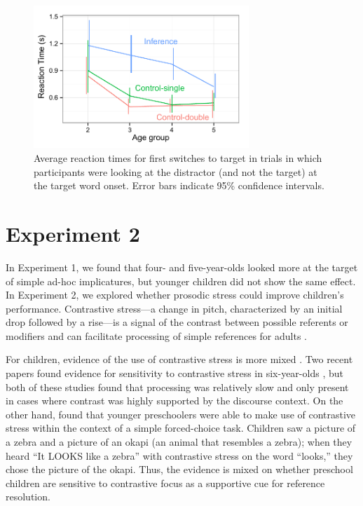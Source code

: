 \documentclass[10pt,letterpaper]{article}
\begin{document}
\begin{figure}
\begin{centering} 
\includegraphics[width=3.2in]{figures/expt1-rt.pdf}
\caption{\label{fig:rt} Average reaction times for first switches to target in trials in which participants were looking at the distractor (and not the target) at the target word onset. Error bars indicate 95\% confidence intervals.}
\end{centering} 
\end{figure}

\section{Experiment 2}

In Experiment 1, we found that four- and five-year-olds looked more at the target of simple ad-hoc implicatures, but younger children did not show the same effect. In Experiment 2, we explored whether prosodic stress could improve children's performance. Contrastive stress---a change in pitch, characterized by an initial drop followed by a rise---is a signal of the contrast between possible referents or modifiers and can facilitate processing of simple references for adults \cite{ito2008anticipatory}.

For children, evidence of the use of contrastive stress is more mixed \cite{cutler1987}. Two recent papers found evidence for sensitivity to contrastive stress in six-year-olds \cite{sekerina2012,ito2012}, but both of these studies found that processing was relatively slow and only present in cases where contrast was highly supported by the discourse context. On the other hand,  found that younger preschoolers were able to make use of contrastive stress within the context of a simple forced-choice task. Children saw a picture of a zebra and a picture of an okapi (an animal that resembles a zebra); when they heard ``It LOOKS like a zebra'' with contrastive stress on the word ``looks,'' they chose the picture of the okapi. Thus, the evidence is mixed on whether preschool children are sensitive to contrastive focus as a supportive cue for reference resolution. 
\end{document}
